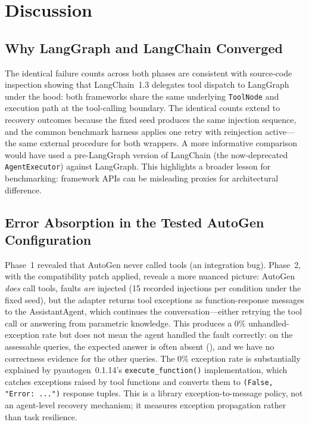 \documentclass[make,article,submit,moreauthors,pdftex]{mdpi}
\newcommand{\Wrev}[1]{\texorpdfstring{{\color{RevisionOrange}#1}}{#1}}
\begin{document}
\section{Discussion}\label{sec:discussion}

\subsection{Why LangGraph and LangChain Converged}\label{sec:lg-lc-convergence}

{The identical failure counts across both phases are consistent with source-code inspection showing that LangChain~1.3 delegates tool dispatch to LangGraph under the hood: both frameworks share the same underlying \texttt{ToolNode} and execution path at the tool-calling boundary. The identical counts extend to recovery outcomes because the fixed seed produces the same injection sequence, and the common benchmark harness applies one retry with reinjection active---the same external procedure for both wrappers. A more informative comparison would have used a pre-LangGraph version of LangChain (the now-deprecated \texttt{AgentExecutor}) against LangGraph. This highlights a broader lesson for benchmarking: framework APIs can be misleading proxies for architectural difference.}

\subsection{\Wrev{Error Absorption in the Tested AutoGen Configuration}}

Phase~1 revealed that AutoGen never called tools (an integration bug). Phase~2, with the compatibility patch applied, reveals a more nuanced picture: AutoGen \emph{does} call tools, faults \emph{are} injected (15 recorded injections per condition under the fixed seed), but the adapter returns tool exceptions as function-response messages to the AssistantAgent, which continues the conversation---either retrying the tool call or answering from parametric knowledge. This produces a 0\% unhandled-exception rate but does not mean the agent handled the fault correctly: \Wrev{on the assessable queries, the expected answer is often absent (\Cref{tab:handling-vs-completion}), and we have no correctness evidence for the other queries.} The 0\% exception rate is substantially explained by pyautogen~0.1.14's \texttt{execute\_function()} implementation, which catches exceptions raised by tool functions and converts them to \texttt{(False, "Error:~...")} response tuples. This is a library exception-to-message policy, not an agent-level recovery mechanism; it measures exception propagation rather than task resilience.
\end{document}
